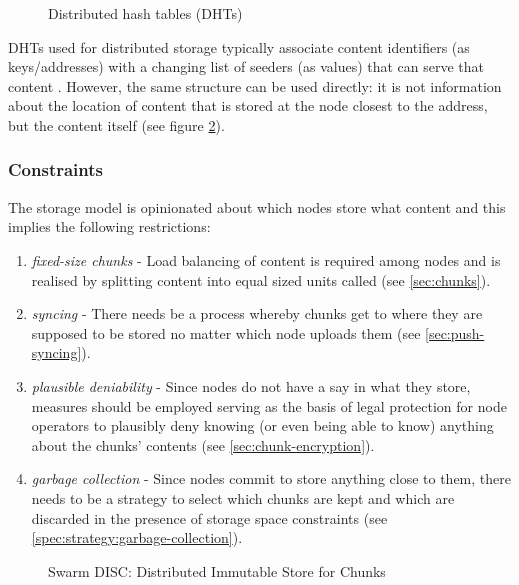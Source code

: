 \begin{figure}[htbp]
   \centering
   \caption[Distributed hash tables (DHTs)]{Distributed hash tables (DHTs)}
   \label{fig:DHT}
\end{figure}

DHTs used for distributed storage typically associate content identifiers (as keys/addresses) with a changing list of seeders (as values) that can serve that content \cite{ipfs2014, bittorrent}. However, the same structure can be used directly: it is not information about the location of content that is stored at the node closest to the address, but the content itself (see figure \ref{fig:disc}). 

\subsubsection{Constraints}
The  storage model is opinionated about which nodes store what content and this implies the following restrictions: 

\begin{enumerate}
    \item \emph{fixed-size chunks} - Load balancing of content is required among nodes and is realised by splitting content into equal sized units called   (see \ref{sec:chunks}).
    \item \emph{syncing} - There needs be a process whereby chunks get to where they are supposed to be stored no matter which node uploads them (see \ref{sec:push-syncing}).
    \item \emph{plausible deniability} - Since nodes do not have a say in what they store, measures should be employed serving as the basis of legal protection for node operators to plausibly deny knowing (or even being able to know) anything about the chunks' contents (see \ref{sec:chunk-encryption}).
    \item \emph{garbage collection} - Since nodes commit to store anything close to them, there needs to be a strategy to select which chunks are kept and which are discarded in the presence of storage space constraints (see  \ref{spec:strategy:garbage-collection}). 
\end{enumerate}


\begin{figure}[htbp]
   \centering
   \caption[Swarm DISC:  Distributed Immutable Store for Chunks]{Swarm DISC:  Distributed Immutable Store for Chunks}
   \label{fig:disc}
\end{figure}

